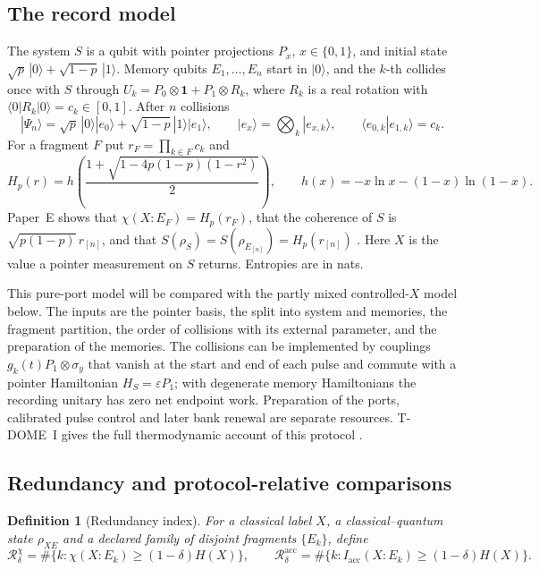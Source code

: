 \documentclass[12pt,a4paper]{article}
\newtheorem{definition}[theorem]{Definition}
\begin{document}
\subsection{The record model}

The system $S$ is a qubit with pointer projections $P_x$, $x\in\{0,1\}$, and initial state $\sqrt p\,|0\rangle+\sqrt{1-p}\,|1\rangle$. Memory qubits $E_1,\dots,E_n$ start in $|0\rangle$, and the $k$-th collides once with $S$ through $U_k=P_0\otimes\mathbf 1+P_1\otimes R_k$, where $R_k$ is a real rotation with $\langle0|R_k|0\rangle=c_k\in[0,1]$. After $n$ collisions
\begin{equation}
|\Psi_n\rangle=\sqrt p\,|0\rangle|e_0\rangle+\sqrt{1-p}\,|1\rangle|e_1\rangle,\qquad
|e_x\rangle=\bigotimes_k|e_{x,k}\rangle,\qquad \langle e_{0,k}|e_{1,k}\rangle=c_k .
\label{eq:branching}
\end{equation}
For a fragment $F$ put $r_F=\prod_{k\in F}c_k$ and
\[
H_p(r)=h\!\left(\frac{1+\sqrt{1-4p(1-p)(1-r^2)}}2\right),\qquad h(x)=-x\ln x-(1-x)\ln(1-x).
\]
Paper~E shows that $\chi(X:E_F)=H_p(r_F)$, that the coherence of $S$ is $\sqrt{p(1-p)}\,r_{[n]}$, and that $S(\rho_S)=S(\rho_{E_{[n]}})=H_p(r_{[n]})$ \cite{Liu2026PaperE}. Here $X$ is the value a pointer measurement on $S$ returns. Entropies are in nats.

This pure-port model will be compared with the partly mixed controlled-$X$
model below. The inputs are the pointer basis, the split into system and memories, the fragment partition, the order of collisions with its external parameter, and the preparation of the memories. The collisions can be implemented by couplings $g_k(t)P_1\otimes\sigma_y$ that vanish at the start and end of each pulse and commute with a pointer Hamiltonian $H_S=\varepsilon P_1$; with degenerate memory Hamiltonians the recording unitary has zero net endpoint work. Preparation of the ports, calibrated pulse control and later bank renewal are separate resources. T-DOME~I gives the full thermodynamic account of this protocol \cite{Liu2026TDOME_I}.

\subsection{Redundancy and protocol-relative comparisons}

\begin{definition}[Redundancy index]
\label{def:redundancy}
For a classical label $X$, a classical--quantum state $\rho_{XE}$ and a declared family of disjoint fragments $\{E_k\}$, define
\[
\mathcal R^{\chi}_\delta=\#\bigl\{k:\chi(X:E_k)\ge(1-\delta)H(X)\bigr\},\qquad
\mathcal R^{\mathrm{acc}}_\delta=\#\bigl\{k:I_{\mathrm{acc}}(X:E_k)\ge(1-\delta)H(X)\bigr\}.
\]
\end{definition}
\end{document}
